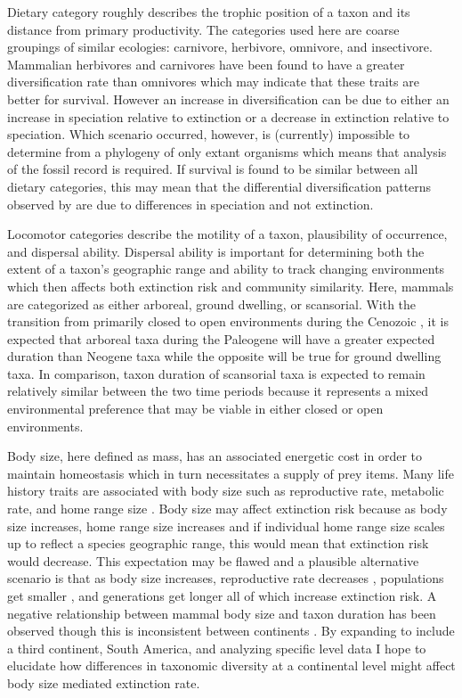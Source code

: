 \documentclass[11pt,letterpaper]{article}
\begin{document}
Dietary category roughly describes the trophic position of a taxon and its distance from primary productivity. The categories used here are coarse groupings of similar ecologies: carnivore, herbivore, omnivore, and insectivore. Mammalian herbivores and carnivores have been found to have a greater diversification rate than omnivores \citep{Price2012} which may indicate that these traits are better for survival. However an increase in diversification can be due to either an increase in speciation relative to extinction or a decrease in extinction relative to speciation. Which scenario occurred, however, is (currently) impossible to determine from a phylogeny of only extant organisms \citep{Rabosky2010a} which means that analysis of the fossil record is required. If survival is found to be similar between all dietary categories, this may mean that the differential diversification patterns observed by \citet{Price2012} are due to differences in speciation and not extinction. 

Locomotor categories describe the motility of a taxon, plausibility of occurrence, and dispersal ability. Dispersal ability is important for determining both the extent of a taxon's geographic range and ability to track changing environments \citep{Birand2012,Jablonski2006a,Gaston2009} which then affects both extinction risk and community similarity. Here, mammals are categorized as either arboreal, ground dwelling, or scansorial. With the transition from primarily closed to open environments during the Cenozoic \citep{Blois2009,Janis1993a,Stromberg2005,Stromberg2013}, it is expected that arboreal taxa during the Paleogene will have a greater expected duration than Neogene taxa while the opposite will be true for ground dwelling taxa. In comparison, taxon duration of scansorial taxa is expected to remain relatively similar between the two time periods because it represents a mixed environmental preference that may be viable in either closed or open environments. 

Body size, here defined as mass, has an associated energetic cost in order to maintain homeostasis which in turn necessitates a supply of prey items. Many life history traits are associated with body size such as reproductive rate, metabolic rate, and home range size \cite{Peters1983a,Damuth1979,Brown1987,Smith2004}. Body size may affect extinction risk because as body size increases, home range size increases \citep{Damuth1979} and if individual home range size scales up to reflect a species geographic range, this would mean that extinction risk would decrease. This expectation may be flawed and a plausible alternative scenario is that as body size increases, reproductive rate decreases \citep{Johnson2002b}, populations get smaller \citep{White2007}, and generations get longer \citep{Martin1993a} all of which increase extinction risk. A negative relationship between mammal body size and taxon duration has been observed \citep{Liow2008,Davidson2012} though this is inconsistent between continents \citep{Tomiya2013,Liow2008}. By expanding to include a third continent, South America, and analyzing specific level data I hope to elucidate how differences in taxonomic diversity at a continental level might affect body size mediated extinction rate. 
\end{document}
